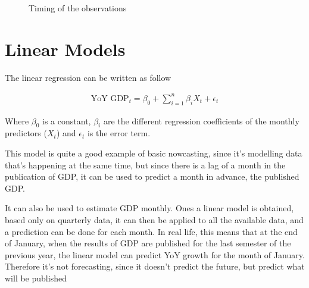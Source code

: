 \documentclass[12pt,a4paper,oneside]{book}
\newcommand{\ImageWidth}{11cm}
\begin{document}
\begin{figure}[!htp]
     \centering \footnotesize
{}
    \caption{Timing of the observations}
    \label{fig:time of the data}
\end{figure}


\section{Linear Models}

The linear regression can be written as follow

\begin{eqnarray}
    \text{YoY GDP}_{t} = \beta_0 + \sum^n_{i = 1}
       \beta_{i} X_{t} + \epsilon_t 
\end{eqnarray}

Where $\beta_{0}$ is a constant, $\beta_{i}$  are the different regression coefficients of the monthly predictors ($X_{t}$) and $\epsilon_t$ is the error term.

This model is quite a good example of basic nowcasting, since it's modelling data that's happening at the same time, but since there is a lag of a month in the publication of GDP, it can be used to predict a month in advance, the published GDP.

It can also be used to estimate GDP monthly. Ones a linear model is obtained, based only on quarterly data, it can then be applied to all the available data, and a prediction can be done for each month.
In real life, this means that at the end of January, when the results of GDP are published for the last semester of the previous year, the linear model can predict YoY growth for the month of January. Therefore it's not forecasting, since it doesn't predict the future, but predict what will be published
\end{document}
